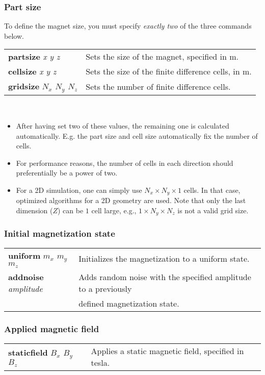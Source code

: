 \newcommand{\defcommand}[2][\space]{\textbf{#2}\index{#2}\label{#2} \textit{#1}}


\subsubsection*{Part size}
To define the magnet size, you must specify \emph{exactly two} of the three commands below.\\

\begin{tabular}{ll}
\defcommand[x y z]{partsize}  & Sets the size of the magnet, specified in m. \\
\defcommand[x y z]{cellsize}  & Sets the size of the finite difference cells, in m. \\
\defcommand[$N_x$ $N_y$ $N_z$]{gridsize} & Sets the number of finite difference cells.
\end{tabular}\\
\bigskip

\begin{itemize}
 \item After having set two of these values, the remaining one is calculated automatically. E.g. the part size and cell size automatically fix the number of cells.
 \item For performance reasons, the number of cells in each direction should preferentially be a power of two.
 \item For a 2D simulation, one can simply use $N_x \times N_y \times 1$ cells. In that case, optimized algorithms for a 2D geometry are used. Note that only the last dimension ($Z$) can be $1$ cell large, e.g., $1 \times N_y \times N_z$ is not a valid grid size.
\end{itemize}


\subsubsection*{Initial magnetization state}
\begin{tabular}{ll}
\defcommand[$m_x$ $m_y$ $m_z$]{uniform}  & Initializes the magnetization to a uniform state.\\
\defcommand[amplitude]{addnoise} & Adds random noise with the specified amplitude to a previously\\& defined magnetization state.
\end{tabular}




\subsubsection{Applied magnetic field}
\begin{tabular}{ll}
\defcommand[$B_x$ $B_y$ $B_z$]{staticfield}  & Applies a static magnetic field, specified in tesla.\\
\end{tabular}

